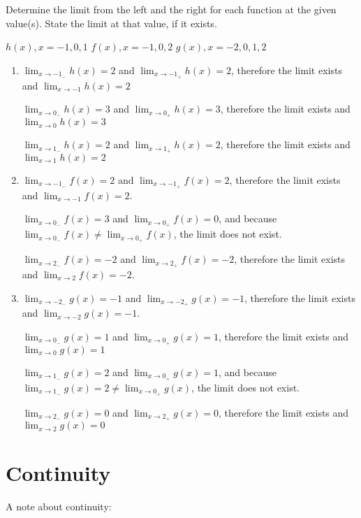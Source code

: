 \begin{Exercise}[title = Limits Practice 4, label=limits4]
Determine the limit from the left and the right for each function at the given 
value(s). State the limit at that value, if it exists.

\Question $h(x), x=-1, 0, 1$
\Question $f(x), x=-1, 0, 2$
\Question $g(x), x=-2, 0, 1, 2$
\vspace{60mm}
\end{Exercise}
\begin{Answer}[ref=limits4]
    \begin{enumerate}
    \item $\lim_{x\to-1_-}h(x) = 2$ and $\lim_{x\to-1_+}h(x)=2$, therefore the limit exists and $\lim_{x\to-1}h(x)=2$

    $\lim_{x\to0_-}h(x) = 3$ and $\lim_{x\to0_+}h(x)=3$, therefore the limit exists and $\lim_{x\to0}h(x)=3$

    $\lim_{x\to1_-}h(x) = 2$ and $\lim_{x\to1_+}h(x)=2$, therefore the limit exists and $\lim_{x\to1}h(x)=2$
    \item $\lim_{x\to-1_-}f(x)=2$ and $\lim_{x\to-1_+}f(x)=2$, therefore the limit exists and $\lim_{x\to-1}f(x) = 2$.

    $\lim_{x\to0_-}f(x) = 3$ and $\lim_{x\to0_+}f(x) = 0$, and because $\lim_{x\to0_-}f(x) \neq \lim_{x\to0_+}f(x)$, the limit does not exist.

    $\lim_{x\to2_-}f(x) = -2$ and $\lim_{x\to2_+}f(x) = -2$, therefore the limit exists and $\lim_{x\to2}f(x) = -2$.

    \item $\lim_{x\to-2_-}g(x) = -1$ and $\lim_{x\to-2_+}g(x) = -1$, therefore the limit exists and $\lim_{x\to-2}g(x) = -1$.

    $\lim_{x\to0_-}g(x)=1$ and $\lim_{x\to0_+}g(x) = 1$, therefore the limit exists and $\lim_{x\to0}g(x) = 1$

    $\lim_{x\to1_-}g(x) = 2$ and $\lim_{x\to0_+}g(x) = 1$, and because $\lim_{x\to1_-}g(x) = 2 \neq \lim_{x\to0_+}g(x)$, the limit does not exist.

    $\lim_{x\to2_-}g(x) = 0$ and $\lim_{x\to2_+}g(x) = 0$, therefore the limit exists and $\lim_{x\to2}g(x) = 0$
\end{enumerate}
\end{Answer}

\section{Continuity}
A note about continuity:

